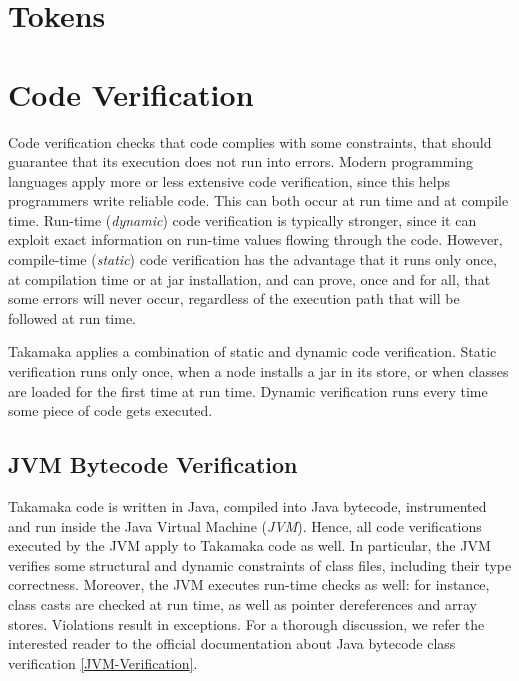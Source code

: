 \documentclass[a4paper,]{book}
\begin{document}
{\hypertarget{tokens}{%
\chapter{Tokens }\label{tokens}}

\hypertarget{code-verification}{%
\chapter{Code Verification }\label{code-verification}}

Code verification checks that code complies with some constraints, that
should guarantee that its execution does not run into errors. Modern
programming languages apply more or less extensive code verification,
since this helps programmers write reliable code. This can both occur at
run time and at compile time. Run-time (\emph{dynamic}) code
verification is typically stronger, since it can exploit exact
information on run-time values flowing through the code. However,
compile-time (\emph{static}) code verification has the advantage that it
runs only once, at compilation time or at jar installation, and can
prove, once and for all, that some errors will never occur, regardless
of the execution path that will be followed at run time.

Takamaka applies a combination of static and dynamic code verification.
Static verification runs only once, when a node installs a jar in its
store, or when classes are loaded for the first time at run time.
Dynamic verification runs every time some piece of code gets executed.

\hypertarget{jvm-bytecode-verification}{%
\section{JVM Bytecode Verification }\label{jvm-bytecode-verification}}

Takamaka code is written in Java, compiled into Java bytecode,
instrumented and run inside the Java Virtual Machine (\emph{JVM}).
Hence, all code verifications executed by the JVM apply to Takamaka code
as well. In particular, the JVM verifies some structural and dynamic
constraints of class files, including their type correctness. Moreover,
the JVM executes run-time checks as well: for instance, class casts are
checked at run time, as well as pointer dereferences and array stores.
Violations result in exceptions. For a thorough discussion, we refer the
interested reader to the official documentation about Java bytecode
class verification
\protect\hyperlink{jvm-verification}{{[}JVM-Verification{]}}.

}
\end{document}
